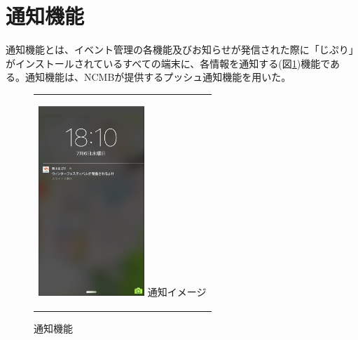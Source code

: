 \section{通知機能}%
\label{func:notice}
通知機能とは、イベント管理の各機能及びお知らせが発信された際に「じぷり」がインストールされているすべての端末に、各情報を通知する(図\ref{fig:notice})機能である。通知機能は、NCMBが提供するプッシュ通知機能を用いた。

\begin{figure}[htbp]
  \begin{center}
    \begin{tabular}{c}

      \begin{minipage}{0.33\hsize}
        \begin{center}
\includegraphics[width=4cm]{notification.png}
          \hspace{1cm} %
          {\footnotesize 通知イメージ}
        \end{center}
      \end{minipage}

    \end{tabular}
    \caption{通知機能}
    \label{fig:notice}
  \end{center}
\end{figure}

